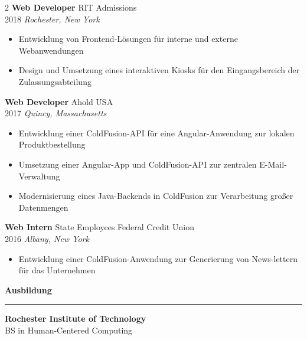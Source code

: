 \documentclass[a4paper,10pt]{article}
\newcommand{\sect}[1]{\vspace{9pt}\textbf{\large #1}\vspace{-10pt}\par\textcolor{maincolor}{\rule{\linewidth}{0.8pt}}\vspace{4pt}}
\begin{document}
\begin{paracol}{2}
\textbf{Web Developer} \hfill RIT Admissions\\
2018 \hfill \textit{Rochester, New York}\par
\begin{itemize}
    \item Entwicklung von Frontend-Lösungen für interne und externe Webanwendungen  
    \item Design und Umsetzung eines interaktiven Kiosks für den Eingangsbereich der Zulassungsabteilung  
\end{itemize}
\medskip

\textbf{Web Developer} \hfill Ahold USA\\
2017 \hfill \textit{Quincy, Massachusetts}\par
\begin{itemize}
    \item Entwicklung einer ColdFusion-API für eine Angular-Anwendung zur lokalen Produktbestellung  
    \item Umsetzung einer Angular-App und ColdFusion-API zur zentralen E-Mail-Verwaltung  
    \item Modernisierung eines Java-Backends in ColdFusion zur Verarbeitung großer Datenmengen  
\end{itemize}

\textbf{Web Intern} \hfill State Employees Federal Credit Union\\
2016 \hfill \textit{Albany, New York}\par
\begin{itemize}
    \item Entwicklung einer ColdFusion-Anwendung zur Generierung von News-lettern für das Unternehmen
\end{itemize}


\sect{Ausbildung}
\textbf{Rochester Institute of Technology}
\\ BS in Human-Centered Computing\par


\end{paracol}
\end{document}

